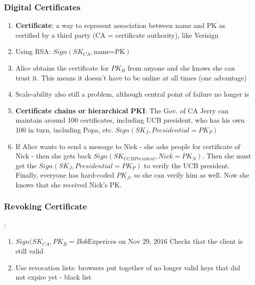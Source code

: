 \documentclass{article}
\begin{document}
\subsubsection{Digital Certificates}
\begin{enumerate}
\item \textbf{Certificate}: a way to represent association between name and PK as certified by a third party (CA = certificate authority), like Verisign
\item Using RSA: $Sign(SK_{CA},\textrm{name=PK})$
\item Alice obtains the certificate for $PK_B$ from anyone and she knows she can trust it. This means it doesn't have to be online at all times (one advantage)
\item Scale-ability also still a problem, although central point of failure no longer is
\item \textbf{Certificate chains or hierarchical PKI}: The Gov. of CA Jerry can maintain around 100 certificates, including UCB president, who has his own 100 in turn, including Popa, etc. $Sign(SK_J, Presidential=PK_P)$
\item If Alice wants to send a message to Nick - she asks people for certificate of Nick - then she gets back $Sign(SK_{UCB President}, Nick=PK_N)$. Then she must get the $Sign(SK_J, Presidential=PK_P)$ to verify the UCB president. Finally, everyone has hard-coded $PK_J$, so she can verify him as well. Now she knows that she received Nick's PK.
\end{enumerate}

\subsubsection{Revoking Certificate}: 
\begin{enumerate}
\item $Sign(SK_{CA}, PK_B=Bob\textrm{Experices on Nov 29, 2016}$ Checks that the client is still valid
\item Use revocation lists: browsers put together of no longer valid keys that did not expire yet - black list
\end{enumerate}
\end{document}
